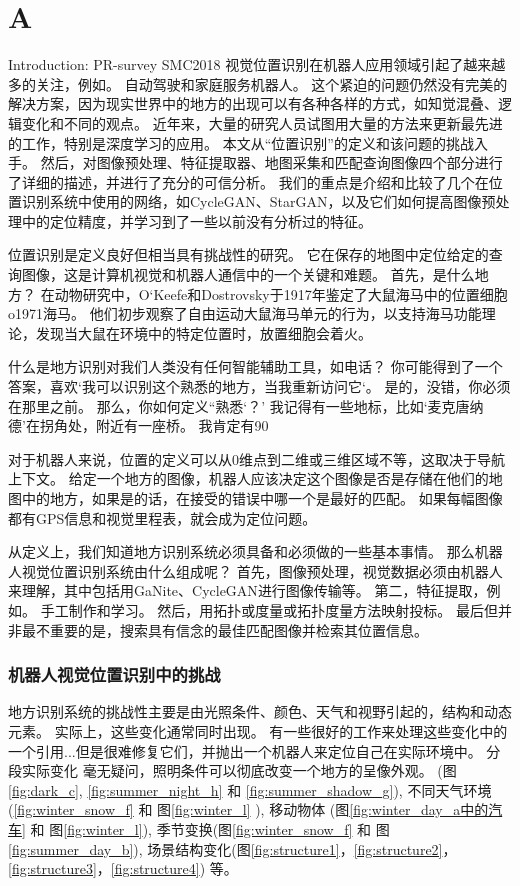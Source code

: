 \chapter{A}
\label{ch:intro}
Introduction: PR-survey SMC2018
视觉位置识别在机器人应用领域引起了越来越多的关注，例如。 自动驾驶和家庭服务机器人。 这个紧迫的问题仍然没有完美的解决方案，因为现实世界中的地方的出现可以有各种各样的方式，如知觉混叠、逻辑变化和不同的观点。 近年来，大量的研究人员试图用大量的方法来更新最先进的工作，特别是深度学习的应用。 本文从“位置识别”的定义和该问题的挑战入手。 然后，对图像预处理、特征提取器、地图采集和匹配查询图像四个部分进行了详细的描述，并进行了充分的可信分析。 我们的重点是介绍和比较了几个在位置识别系统中使用的网络，如CycleGAN、StarGAN，以及它们如何提高图像预处理中的定位精度，并学习到了一些以前没有分析过的特征。

位置识别是定义良好但相当具有挑战性的研究。 它在保存的地图中定位给定的查询图像，这是计算机视觉和机器人通信中的一个关键和难题。 首先，是什么地方？ 在动物研究中，O‘Keefe和Dostrovsky于1917年鉴定了大鼠海马中的位置细胞{o1971海马}。 他们初步观察了自由运动大鼠海马单元的行为，以支持海马功能理论，发现当大鼠在环境中的特定位置时，放置细胞会着火。 

 什么是地方识别对我们人类没有任何智能辅助工具，如电话？ 你可能得到了一个答案，喜欢‘我可以识别这个熟悉的地方，当我重新访问它‘。 是的，没错，你必须在那里之前。 那么，你如何定义“熟悉‘？’ 我记得有一些地标，比如‘麦克唐纳德’在拐角处，附近有一座桥。 我肯定有90%

对于机器人来说，位置的定义可以从0维点到二维或三维区域不等，这取决于导航上下文\cite{2016visual}\cite{kuipers2000spatial}。 给定一个地方的图像，机器人应该决定这个图像是否是存储在他们的地图中的地方，如果是的话，在接受的错误中哪一个是最好的匹配。 如果每幅图像都有GPS信息和视觉里程表，就会成为定位问题。 

从定义上，我们知道地方识别系统必须具备和必须做的一些基本事情。
那么机器人视觉位置识别系统由什么组成呢？ 首先，图像预处理，视觉数据必须由机器人来理解，其中包括用GaNite\cite{latif2017addressing}、CycleGAN\cite{zhu2017unpair}进行图像传输等。 第二，特征提取，例如。 手工制作和学习。 然后，用拓扑或度量或拓扑度量方法映射投标。 最后但并非最不重要的是，搜索具有信念的最佳匹配图像并检索其位置信息。

\subsection{机器人视觉位置识别中的挑战}地方识别系统的挑战性主要是由光照条件、颜色、天气和视野引起的，结构和动态元素。 实际上，这些变化通常同时出现。 有一些很好的工作来处理这些变化中的一个引用...但是很难修复它们，并抛出一个机器人来定位自己在实际环境中。
分段{实际变化}
毫无疑问，照明条件可以彻底改变一个地方的呈像外观。
(图\ref{fig:dark_c}, \ref{fig:summer_night_h}  和 \ref{fig:summer_shadow_g}), 不同天气环境(\ref{fig:winter_snow_f} 和 图\ref{fig:winter_l} ), 移动物体 (图\ref{fig:winter_day_a中的汽车} 和 图\ref{fig:winter_l}),  季节变换(图\ref{fig:winter_snow_f} 和 图\ref{fig:summer_day_b}), 场景结构变化(图\ref{fig:structure1}，\ref{fig:structure2}，\ref{fig:structure3}，\ref{fig:structure4}) 等。

